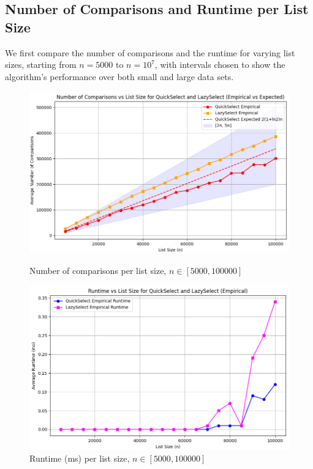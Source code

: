 \documentclass{article}
\begin{document}
\subsection{Number of Comparisons and Runtime per List Size}

We first compare the number of comparisons and the runtime for varying list sizes, starting from \(n = 5000\) to \(n = 10^7\), with intervals chosen to show the algorithm's performance over both small and large data sets.

\begin{figure}[H]
    \centering
    \begin{minipage}{0.45\textwidth}
        \centering
        \includegraphics[width=\textwidth]{assets1/graphics/comparisons_results_5000_100000_5000_100.png}
        \caption{Number of comparisons per list size, $n \in [5000, 100000]$}
    \end{minipage}
    \hfill
    \begin{minipage}{0.45\textwidth}
        \centering
        \includegraphics[width=\textwidth]{assets1/graphics/runtime_results_5000_100000_5000_100.png}
        \caption{Runtime (ms) per list size, $n \in [5000, 100000]$}
    \end{minipage}
\end{figure}
\end{document}
